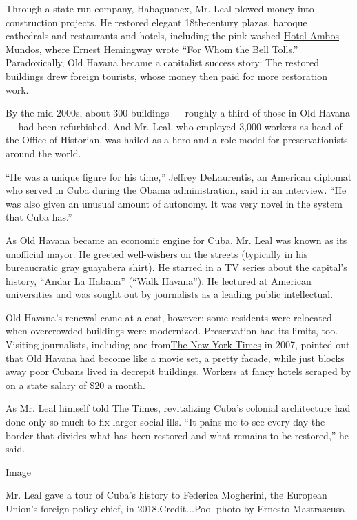 Through a state-run company, Habaguanex, Mr. Leal plowed money into
construction projects. He restored elegant 18th-century plazas, baroque
cathedrals and restaurants and hotels, including the pink-washed
\href{https://www.gaviotahotels.com/en/hotels-in-cuba/old-havana/hotel-ambos-mundos}{Hotel
Ambos Mundos}, where Ernest Hemingway wrote ``For Whom the Bell Tolls.''
Paradoxically, Old Havana became a capitalist success story: The
restored buildings drew foreign tourists, whose money then paid for more
restoration work.

By the mid-2000s, about 300 buildings --- roughly a third of those in
Old Havana --- had been refurbished. And Mr. Leal, who employed 3,000
workers as head of the Office of Historian, was hailed as a hero and a
role model for preservationists around the world.

``He was a unique figure for his time,'' Jeffrey DeLaurentis, an
American diplomat who served in Cuba during the Obama administration,
said in an interview. ``He was also given an unusual amount of autonomy.
It was very novel in the system that Cuba has.''

As Old Havana became an economic engine for Cuba, Mr. Leal was known as
its unofficial mayor. He greeted well-wishers on the streets (typically
in his bureaucratic gray guayabera shirt). He starred in a TV series
about the capital's history, ``Andar La Habana'' (``Walk Havana''). He
lectured at American universities and was sought out by journalists as a
leading public intellectual.

Old Havana's renewal came at a cost, however; some residents were
relocated when overcrowded buildings were modernized. Preservation had
its limits, too. Visiting journalists, including one
from\href{https://www.nytimes3xbfgragh.onion/2007/12/06/world/americas/06havana.html}{The
New York Times} in 2007, pointed out that Old Havana had become like a
movie set, a pretty facade, while just blocks away poor Cubans lived in
decrepit buildings. Workers at fancy hotels scraped by on a state salary
of \$20 a month.

As Mr. Leal himself told The Times, revitalizing Cuba's colonial
architecture had done only so much to fix larger social ills. ``It pains
me to see every day the border that divides what has been restored and
what remains to be restored,'' he said.

Image

Mr. Leal gave a tour of Cuba's history to Federica Mogherini, the
European Union's foreign policy chief, in 2018.Credit...Pool photo by
Ernesto Mastrascusa

